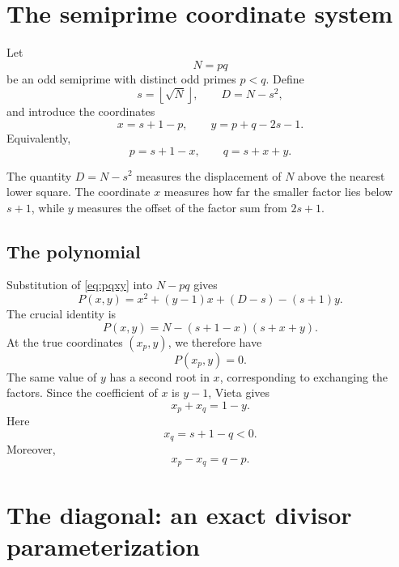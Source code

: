 \documentclass[11pt,a4paper]{article}
\newcommand{\floor}[1]{\left\lfloor #1 \right\rfloor}
\begin{document}
\section{The semiprime coordinate system}
\label{sec:coordinates}

Let
\[
N=pq
\]
be an odd semiprime with distinct odd primes \(p<q\). Define
\begin{equation}
s=\floor{\sqrt N},
\qquad
D=N-s^2,
\label{eq:sD}
\end{equation}
and introduce the coordinates
\begin{equation}
\boxed{x=s+1-p},
\qquad
\boxed{y=p+q-2s-1}.
\label{eq:xytrue}
\end{equation}
Equivalently,
\begin{equation}
\boxed{p=s+1-x},
\qquad
\boxed{q=s+x+y}.
\label{eq:pqxy}
\end{equation}

The quantity \(D=N-s^2\) measures the displacement of \(N\) above the nearest lower square. The coordinate \(x\) measures how far the smaller factor lies below \(s+1\), while \(y\) measures the offset of the factor sum from \(2s+1\).

\subsection{The polynomial}

Substitution of \eqref{eq:pqxy} into \(N-pq\) gives
\begin{equation}
\boxed{
P(x,y)=x^2+(y-1)x+(D-s)-(s+1)y.
}
\label{eq:P}
\end{equation}
The crucial identity is
\begin{equation}
\boxed{
P(x,y)=N-(s+1-x)(s+x+y).
}
\label{eq:Pfactor}
\end{equation}
At the true coordinates \((x_p,y)\), we therefore have
\begin{equation}
P(x_p,y)=0.
\end{equation}
The same value of \(y\) has a second root in \(x\), corresponding to exchanging the factors. Since the coefficient of \(x\) is \(y-1\), Vieta gives
\begin{equation}
\boxed{x_p+x_q=1-y.}
\label{eq:vieta}\end{equation}
Here
\[
x_q=s+1-q<0.
\]
Moreover,
\begin{equation}
\boxed{x_p-x_q=q-p.}
\label{eq:gapx}
\end{equation}

\section{The diagonal: an exact divisor parameterization}
\label{sec:diagonal}
\end{document}
